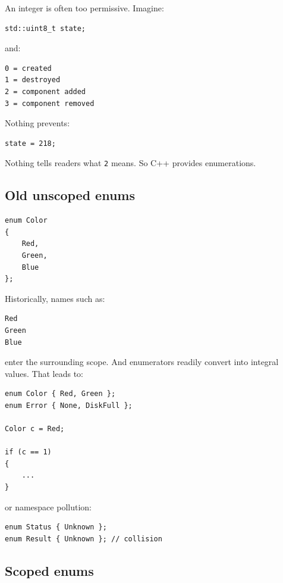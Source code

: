 An integer is often too permissive. Imagine:

\begin{verbatim}
std::uint8_t state;
\end{verbatim}

and:

\begin{verbatim}
0 = created
1 = destroyed
2 = component added
3 = component removed
\end{verbatim}

Nothing prevents:

\begin{verbatim}
state = 218;
\end{verbatim}

Nothing tells readers what \texttt{2} means. So C++ provides enumerations.

\subsection{Old unscoped enums}\label{05-engine-i-ch002-old-unscoped-enums}

\hypertarget{05-engine-i-ch002-old-unscoped-enums}{}

\begin{verbatim}
enum Color
{
    Red,
    Green,
    Blue
};
\end{verbatim}

Historically, names such as:

\begin{verbatim}
Red
Green
Blue
\end{verbatim}

enter the surrounding scope. And enumerators readily convert into integral values. That leads to:

\begin{verbatim}
enum Color { Red, Green };
enum Error { None, DiskFull };

Color c = Red;

if (c == 1)
{
    ...
}
\end{verbatim}

or namespace pollution:

\begin{verbatim}
enum Status { Unknown };
enum Result { Unknown }; // collision
\end{verbatim}

\subsection{Scoped enums}\label{05-engine-i-ch002-scoped-enums}

